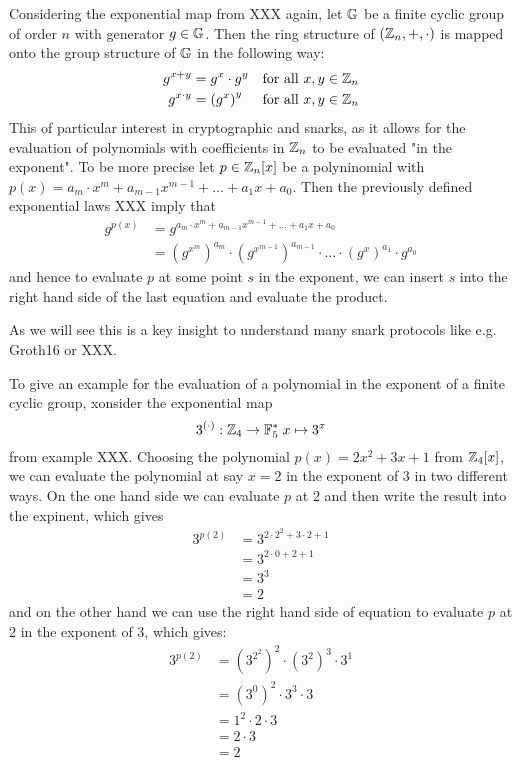 Considering the exponential map from XXX again, let $\mathbb{G}$ be a finite cyclic group of order $n$ with generator $g\in\mathbb{G}$. Then the ring structure of $(\mathbb{Z}_n,+,\cdot)$ is mapped onto the group structure of $\mathbb{G}$ in the following way:
\begin{align*}
g^{x+y} &= g^x\cdot g^y & \text{for all } x,y\in\mathbb{Z}_n\\
g^{x\cdot y} &= \left( g^x\right)^y & \text{for all } x,y\in\mathbb{Z}_n
\end{align*}
This of particular interest in cryptographic and snarks, as it allows for the evaluation of polynomials with coefficients in $\mathbb{Z}_n$ to be evaluated "in the exponent". To be more precise let $p\in \mathbb{Z}_n[x]$ be a polyninomial with $p(x)=a_m\cdot x^m+a_{m-1}x^{m-1}+\ldots + a_1x +a_0$. Then the previously defined exponential laws XXX imply that
\begin{align*}
g^{p(x)} & = g^{a_m\cdot x^m+a_{m-1}x^{m-1}+\ldots + a_1x +a_0}\\
         & = \left(g^{x^m}\right)^{a_m}\cdot \left(g^{x^{m-1}}\right)^{a_{m-1}}\cdot \ldots\cdot \left(g^{x}\right)^{a_1}\cdot g^{a_0}
\end{align*}
and hence to evaluate $p$ at some point $s$ in the exponent, we can insert $s$ into the right hand side of the last equation and evaluate the product.
 
As we will see this is a key insight to understand many snark protocols like e.g. Groth16 or XXX.
\begin{example} To give an example for the evaluation of a polynomial in the exponent of a finite cyclic group, xonsider the exponential map 
$$
3^{(\cdot)}: \mathbb{Z}_4 \to \mathbb{F}_5^* \; x \mapsto 3^x
$$
from example XXX. Choosing the polynomial $p(x)= 2x^2 +3x +1$ from $\mathbb{Z}_4[x]$, we can evaluate the polynomial at say $x=2$ in the exponent of $3$ in two different ways. On the one hand side we can evaluate $p$ at $2$ and then write the result into the expinent, which gives
\begin{align*}
3^{p(2)} &=3^{2\cdot 2^2+3\cdot 2 +1}\\
          & = 3^{2\cdot 0 +2 +1}\\
          & = 3^{3}\\
          & = 2
\end{align*}
and on the other hand we can use the right hand side of equation to evaluate $p$ at $2$ in the exponent of $3$, which gives: 
\begin{align*}
3^{p(2)} &= \left(3^{2^2}\right)^2 \cdot \left(3^{2}\right)^3\cdot 3^1\\
         &= \left(3^{0}\right)^2 \cdot 3^3\cdot 3\\
         &= 1^2 \cdot 2 \cdot 3\\
         &= 2 \cdot 3\\
         &= 2
\end{align*}
\end{example}


